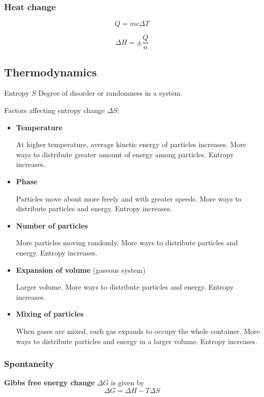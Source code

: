 \subsubsection{Heat change}
\begin{equation}
Q=mc\Delta T
\end{equation}

\begin{equation}
\Delta H=\pm\frac{Q}{n}
\end{equation}

\subsection{Thermodynamics}
\begin{defn}{Entropy $S$}{}
Degree of disorder or randomness in a system.
\end{defn}

Factors affecting entropy change $\Delta S$:
\begin{itemize}
\item \textbf{Temperature} 

At higher temperature, average kinetic energy of particles increases. More ways to distribute greater amount of energy among particles. Entropy increases.

\item \textbf{Phase}

Particles move about more freely and with greater speeds. More ways to distribute particles and energy. Entropy increases.

\item \textbf{Number of particles}

More particles moving randomly. More ways to distribute particles and energy. Entropy increases.

\item \textbf{Expansion of volume} (gaseous system)

Larger volume. More ways to distribute particles and energy. Entropy increases.

\item \textbf{Mixing of particles}

When gases are mixed, each gas expands to occupy the whole container. More ways to distribute particles and energy in a larger volume. Entropy increases.
\end{itemize}

\subsubsection{Spontaneity}
\textbf{Gibbs free energy change} $\Delta G$ is given by
\begin{equation}
\Delta G = \Delta H - T \Delta S
\end{equation}

